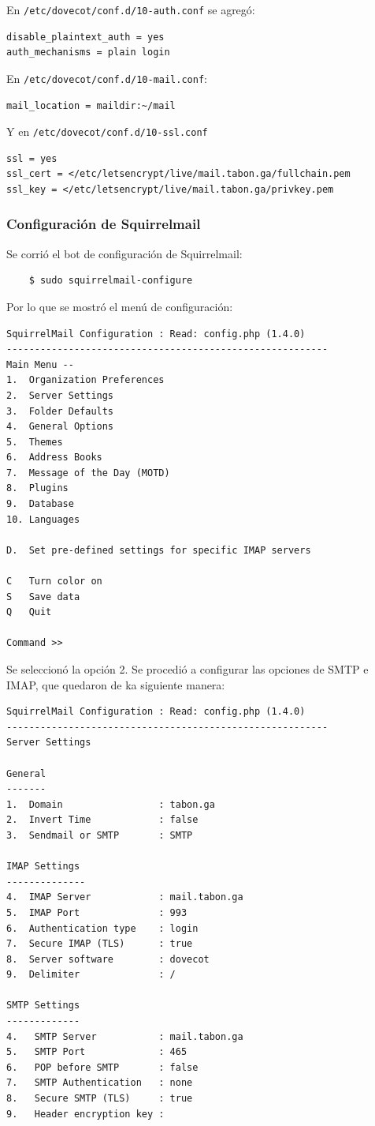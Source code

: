 \documentclass[9pt]{article}
\begin{document}
En \texttt{/etc/dovecot/conf.d/10-auth.conf} se agregó:
\begin{verbatim}
disable_plaintext_auth = yes
auth_mechanisms = plain login
\end{verbatim}

En \texttt{/etc/dovecot/conf.d/10-mail.conf}:
\begin{verbatim}
mail_location = maildir:~/mail
\end{verbatim}

Y en \texttt{/etc/dovecot/conf.d/10-ssl.conf}
\begin{verbatim}
ssl = yes
ssl_cert = </etc/letsencrypt/live/mail.tabon.ga/fullchain.pem
ssl_key = </etc/letsencrypt/live/mail.tabon.ga/privkey.pem
\end{verbatim}

\subsubsection*{Configuración de Squirrelmail}
Se corrió el bot de configuración de Squirrelmail:
\begin{verbatim}
    $ sudo squirrelmail-configure
\end{verbatim}

Por lo que se mostró el menú de configuración:

\begin{verbatim}
SquirrelMail Configuration : Read: config.php (1.4.0)
---------------------------------------------------------
Main Menu --
1.  Organization Preferences
2.  Server Settings
3.  Folder Defaults
4.  General Options
5.  Themes
6.  Address Books
7.  Message of the Day (MOTD)
8.  Plugins
9.  Database
10. Languages

D.  Set pre-defined settings for specific IMAP servers

C   Turn color on
S   Save data
Q   Quit

Command >> 
\end{verbatim}

Se seleccionó la opción 2. Se procedió a configurar las opciones de SMTP e IMAP, que quedaron de ka siguiente manera:

\begin{verbatim}
SquirrelMail Configuration : Read: config.php (1.4.0)
---------------------------------------------------------
Server Settings

General
-------
1.  Domain                 : tabon.ga
2.  Invert Time            : false
3.  Sendmail or SMTP       : SMTP

IMAP Settings
--------------
4.  IMAP Server            : mail.tabon.ga
5.  IMAP Port              : 993
6.  Authentication type    : login
7.  Secure IMAP (TLS)      : true
8.  Server software        : dovecot
9.  Delimiter              : /

SMTP Settings
-------------
4.   SMTP Server           : mail.tabon.ga
5.   SMTP Port             : 465
6.   POP before SMTP       : false
7.   SMTP Authentication   : none
8.   Secure SMTP (TLS)     : true
9.   Header encryption key : 
\end{verbatim}
\end{document}
